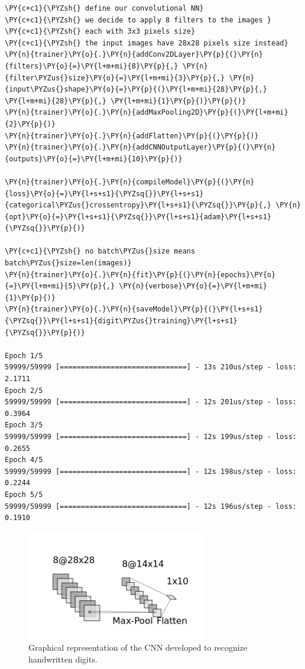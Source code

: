 \begin{codebox}[breakable, size=fbox, boxrule=1pt, pad at break*=1mm,colback=cellbackground, colframe=cellborder]
\begin{Verbatim}[commandchars=\\\{\}]
\PY{c+c1}{\PYZsh{} define our convolutional NN}
\PY{c+c1}{\PYZsh{} we decide to apply 8 filters to the images }
\PY{c+c1}{\PYZsh{} each with 3x3 pixels size}
\PY{c+c1}{\PYZsh{} the input images have 28x28 pixels size instead}
\PY{n}{trainer}\PY{o}{.}\PY{n}{addConv2DLayer}\PY{p}{(}\PY{n}{filters}\PY{o}{=}\PY{l+m+mi}{8}\PY{p}{,} \PY{n}{filter\PYZus{}size}\PY{o}{=}\PY{l+m+mi}{3}\PY{p}{,} \PY{n}{input\PYZus{}shape}\PY{o}{=}\PY{p}{(}\PY{l+m+mi}{28}\PY{p}{,} \PY{l+m+mi}{28}\PY{p}{,} \PY{l+m+mi}{1}\PY{p}{)}\PY{p}{)}
\PY{n}{trainer}\PY{o}{.}\PY{n}{addMaxPooling2D}\PY{p}{(}\PY{l+m+mi}{2}\PY{p}{)}
\PY{n}{trainer}\PY{o}{.}\PY{n}{addFlatten}\PY{p}{(}\PY{p}{)}
\PY{n}{trainer}\PY{o}{.}\PY{n}{addCNNOutputLayer}\PY{p}{(}\PY{n}{outputs}\PY{o}{=}\PY{l+m+mi}{10}\PY{p}{)}
	
\PY{n}{trainer}\PY{o}{.}\PY{n}{compileModel}\PY{p}{(}\PY{n}{loss}\PY{o}{=}\PY{l+s+s1}{\PYZsq{}}\PY{l+s+s1}{categorical\PYZus{}crossentropy}\PY{l+s+s1}{\PYZsq{}}\PY{p}{,} \PY{n}{opt}\PY{o}{=}\PY{l+s+s1}{\PYZsq{}}\PY{l+s+s1}{adam}\PY{l+s+s1}{\PYZsq{}}\PY{p}{)}
	
\PY{c+c1}{\PYZsh{} no batch\PYZus{}size means batch\PYZus{}size=len(images)}
\PY{n}{trainer}\PY{o}{.}\PY{n}{fit}\PY{p}{(}\PY{n}{epochs}\PY{o}{=}\PY{l+m+mi}{5}\PY{p}{,} \PY{n}{verbose}\PY{o}{=}\PY{l+m+mi}{1}\PY{p}{)}
\PY{n}{trainer}\PY{o}{.}\PY{n}{saveModel}\PY{p}{(}\PY{l+s+s1}{\PYZsq{}}\PY{l+s+s1}{digit\PYZus{}training}\PY{l+s+s1}{\PYZsq{}}\PY{p}{)}

Epoch 1/5
59999/59999 [==============================] - 13s 210us/step - loss: 2.1711
Epoch 2/5
59999/59999 [==============================] - 12s 201us/step - loss: 0.3964
Epoch 3/5
59999/59999 [==============================] - 12s 199us/step - loss: 0.2655
Epoch 4/5
59999/59999 [==============================] - 12s 198us/step - loss: 0.2244
Epoch 5/5
59999/59999 [==============================] - 12s 196us/step - loss: 0.1910
\end{Verbatim}
\end{codebox}

\begin{figure}[htb]
	\centering
	\includegraphics[width=0.7\textwidth]{figures/cnn_2d.png}
	\caption{Graphical representation of the CNN developed to recognize handwritten digits.}
        \label{fig:cnn2d}
\end{figure}

